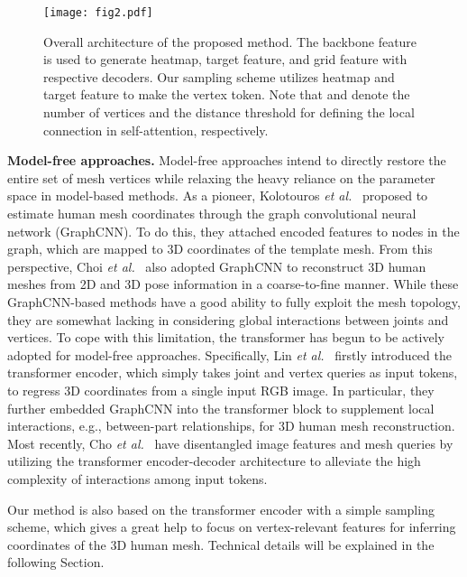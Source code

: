 \documentclass[10pt,twocolumn,letterpaper]{article}
\begin{document}
\begin{figure*}[t]
\vspace{-4mm}
\centerline{\texttt{[image: fig2.pdf]}}
\vspace{-2mm}
\caption{\label{fig:overall_architecture} Overall architecture of the proposed method. The backbone feature is used to generate heatmap, target feature, and grid feature with respective decoders. Our sampling scheme utilizes heatmap and target feature to make the vertex token. Note that  and  denote the number of vertices and the distance threshold for defining the local connection in self-attention, respectively.
 }

\end{figure*}

\vspace{1mm}
\noindent\textbf{Model-free approaches.} Model-free approaches intend to directly restore the entire set of mesh vertices while relaxing the heavy reliance on the parameter space in model-based methods. As a pioneer, Kolotouros {\it et al.}~\cite{Kolotouros19_CVPR} proposed to estimate human mesh coordinates through the graph convolutional neural network (GraphCNN). To do this, they attached encoded features to nodes in the graph, which are mapped to 3D coordinates of the template mesh. From this perspective, Choi {\it et al.}~\cite{Choi20} also adopted GraphCNN to reconstruct 3D human meshes from 2D and 3D pose information in a coarse-to-fine manner. While these GraphCNN-based methods have a good ability to fully exploit the mesh topology, they are somewhat lacking in considering global interactions between joints and vertices. To cope with this limitation, the transformer has begun to be actively adopted for model-free approaches. Specifically, Lin {\it et al.}~\cite{Lin21} firstly introduced the transformer encoder, which simply takes joint and vertex queries as input tokens, to regress 3D coordinates from a single input RGB image. In particular, they further embedded GraphCNN into the transformer block to supplement local interactions, e.g., between-part relationships, for 3D human mesh reconstruction. Most recently, Cho {\it et al.}~\cite{Cho22} have disentangled image features and mesh queries by utilizing the transformer encoder-decoder architecture to alleviate the high complexity of interactions among input tokens.

Our method is also based on the transformer encoder with a simple sampling scheme, which gives a great help to focus on vertex-relevant features for inferring coordinates of the 3D human mesh. Technical details will be explained in the following Section.
 
\end{document}
